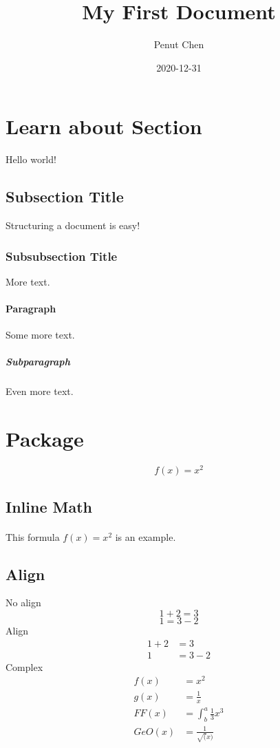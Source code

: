 \documentclass{article}
\title{My First Document}
\date{2020-12-31}
\author{Penut Chen}
\begin{document}
\maketitle
{}

\newpage

\doublespacing
\tableofcontents
\singlespacing
\newpage

\section{Learn about Section}
Hello world!
\subsection{Subsection Title}
Structuring a document is easy!
\subsubsection{Subsubsection Title}
More text.
\paragraph{Paragraph}
Some more text.
\subparagraph{Subparagraph}
Even more text.

\section{Package}
\begin{equation*}
    f(x)=x^2
\end{equation*}
\subsection{Inline Math}
\paragraph{}
This formula $f(x)=x^2$ is an example.
\subsection{Align}
No align
\begin{equation*}
    1+2=3
\end{equation*}
\begin{equation*}
    1=3-2
\end{equation*}
Align
\begin{align*}
    1+2&=3\\
    1&=3-2
\end{align*}
Complex
\begin{align}
    f(x)&=x^2\\
    g(x)&=\frac{1}{x}\\
    FF(x)&=\int^a_b\frac{1}{3}x^3\\
    GeO(x)&=\frac{1}{\sqrt(x)}
\end{align}
\end{document}
